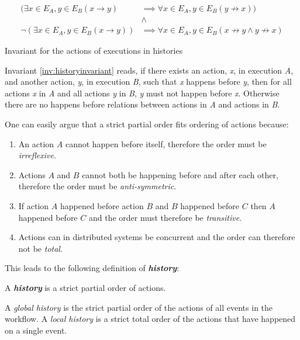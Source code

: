 	\begin{invariant}
		\begin{align*}
			(\exists{x\in E_A, y\in E_B}(x\rightarrow y) &\implies \forall{x\in E_A, y\in E_B}(y\not\rightarrow x))\\
			&\land \\
			\lnot(\exists{x\in E_A, y\in E_B}(x \rightarrow y)) &\implies \forall{x\in E_A, y\in E_B}(x\not\rightarrow y\land y\not\rightarrow x)
		\end{align*}
		\caption{Invariant for the actions of executions in histories}
		\label{inv:historyinvariant}
	\end{invariant}
	
	\newpar
	Invariant \ref{inv:historyinvariant} reads, if there exists an action, \textit{x}, in execution \textit{A}, and another action, \textit{y}, in execution \textit{B}, such that \textit{x} happens before \textit{y}, then for all actions \textit{x} in \textit{A} and all actions \textit{y} in \textit{B}, \textit{y} must not happen before \textit{x}. Otherwise there are no happens before relations between actions in \textit{A} and actions in \textit{B}.
    
	\newpar One can easily argue that a strict partial order fits ordering of actions because:
	\begin{enumerate}
		\item An action $A$ cannot happen before itself, therefore the order must be \textit{irreflexive}.
		\item Actions $A$ and $B$ cannot both be happening before and after each other, therefore the order must be \textit{anti-symmetric}.
		\item If action $A$ happened before action $B$ and $B$ happened before $C$ then $A$ happened before $C$ and the order must therefore be \textit{transitive}.
		\item Actions can in distributed systems be concurrent and the order can therefore not be \textit{total}.
	\end{enumerate}
	
	\newpar This leads to the following definition of \textbf{\textit{history}}:
	
	\begin{definition}
		A \textit{\textbf{history}} is a strict partial order of actions.
	\end{definition}
	
    \noindent A \textit{global history} is the strict partial order of the actions of all events in the workflow. A \textit{local history} is a strict total order of the actions that have happened on a single event.
    
